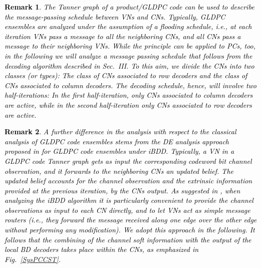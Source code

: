 \documentclass[journal]{IEEEtran}
\newtheorem{remark}{Remark}
\newcommand{\GL}{\textcolor{black}}
\newcommand{\GLC}[1]{\textcolor{black}{\textbf{\textit{#1}}}}
\begin{document}


\GL{\begin{remark}
	The Tanner graph of a product/GLDPC code can be used to describe the message-passing schedule between VNs and CNs. Typically, GLDPC ensembles are analyzed under the assumption of a flooding schedule, i.e., at each iteration VNs pass a message to all the neighboring CNs, and all CNs pass a message to their neighboring VNs. While the principle can be applied to PCs, too, in the following we will analyze a message passing schedule that follows from the decoding algorithm described in Sec.~III. To this aim, we divide the CNs into two classes (or types): The class of CNs associated to row decoders and the class of CNs associated to column decoders. The decoding schedule, hence, will involve two half-iterations: In the first half-iteration, only CNs associated to column decoders are active, while in the second half-iteration only CNs associated to row decoders are active.
\end{remark}}

\GL{\begin{remark}
		A further difference in the analysis with respect to the classical analysis of GLDPC code ensembles stems from the DE analysis approach proposed in \cite{JianPfister2017} for GLDPC code ensembles under iBDD. Typically, a VN in a GLDPC code Tanner graph gets as input the corresponding codeword bit channel observation, and it forwards to the neighboring CNs an updated belief. The updated belief accounts for the channel observation and the extrinsic information provided at the previous iteration, by the CNs output. As suggested in \cite{JianPfister2017}, when analyzing the iBDD algorithm it is particularly convenient to provide the channel observations as input to each CN directly, and to let VNs act as simple message routers (i.e., they forward the message received along one edge over the other edge without performing any modification). We adopt this approach in the following. It follows that the combining of the channel soft information with the output of the local BD decoders takes place within the CNs, as emphasized in Fig.~\ref{SysPCCST}.
\end{remark}}
\end{document}
